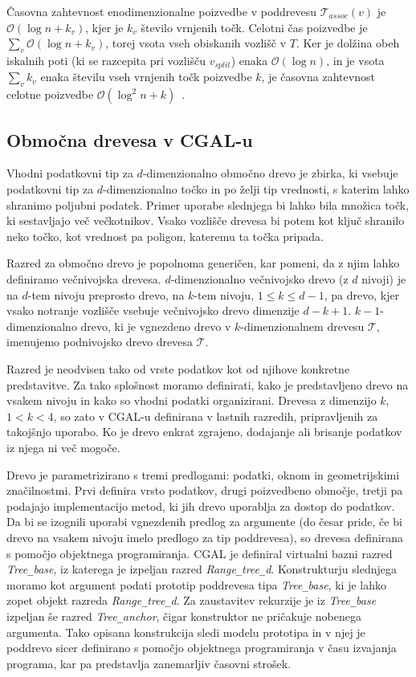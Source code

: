 \documentclass[a4paper, 12pt]{book}
\newcommand{\T}{\ensuremath{\mathcal{T}}}
\newcommand{\OO}{\ensuremath{\mathcal{O}}} %
\newcommand{\U}{\texttt{\_}}
\begin{document}
Časovna zahtevnost enodimenzionalne poizvedbe v poddrevesu $\T_{assoc}(v)$ je $\OO(\log n + k_v)$, kjer je $k_v$ število vrnjenih točk. Celotni čas poizvedbe je $\sum_v\OO(\log n + k_v)$, torej vsota vseh obiskanih vozlišč v $T$. Ker je dolžina obeh iskalnih poti (ki se razcepita pri vozlišču $v_{split}$) enaka $\OO(\log n)$, in je vsota $\sum_v k_v$ enaka številu vseh vrnjenih točk poizvedbe $k$, je časovna zahtevnost celotne poizvedbe $\OO(\log^2n + k)$~\cite[poglavje 5.3]{bkos-08-all}.

\subsection{Območna drevesa v CGAL-u}
Vhodni podatkovni tip za $d$-dimenzionalno območno drevo je zbirka, ki vsebuje podatkovni tip za $d$-dimenzionalno točko in po želji tip vrednosti, s katerim lahko shranimo poljubni podatek. Primer uporabe slednjega bi lahko bila množica točk, ki sestavljajo več večkotnikov. Vsako vozlišče drevesa bi potem kot ključ shranilo neko točko, kot vrednost pa poligon, kateremu ta točka pripada. 

Razred za območno drevo je popolnoma generičen, kar pomeni, da z njim lahko definiramo večnivojska drevesa. $d$-dimenzionalno večnivojsko drevo  (z $d$ nivoji) je na $d$-tem nivoju preprosto drevo, na $k$-tem nivoju, $1 \leq k \leq d-1$, pa drevo, kjer vsako notranje vozlišče vsebuje večnivojsko drevo dimenzije $d-k+1$. $k-1$-dimenzionalno drevo, ki je vgnezdeno drevo v $k$-dimenzionalnem drevesu \T, imenujemo podnivojsko drevo drevesa \T. 


Razred je neodvisen tako od vrste podatkov kot od njihove konkretne predstavitve. Za tako splošnost moramo definirati, kako je predstavljeno drevo na vsakem nivoju in kako so vhodni podatki organizirani. Drevesa z dimenzijo $k$, $ 1 < k < 4$, so zato v CGAL-u definirana v lastnih razredih, pripravljenih za takojšnjo uporabo. Ko je drevo enkrat zgrajeno, dodajanje ali brisanje podatkov iz njega ni več mogoče.

\bigbreak
Drevo je parametrizirano s tremi predlogami: podatki, oknom in geometrijskimi značilnostmi. Prvi definira vrsto podatkov, drugi poizvedbeno območje, tretji pa podajajo implementacijo metod, ki jih drevo uporablja za dostop do podatkov. Da bi se izognili uporabi vgnezdenih predlog za argumente (do česar pride, če bi drevo na vsakem nivoju imelo predlogo za tip poddrevesa), so drevesa definirana s pomočjo objektnega programiranja. CGAL je definiral virtualni bazni razred \textit{Tree\U base}, iz katerega je izpeljan razred \textit{Range\U tree\U d}. Konstrukturju slednjega moramo kot argument podati prototip poddrevesa tipa \textit{Tree\U base}, ki je lahko zopet objekt razreda \textit{Range\U tree\U d}. Za zaustavitev rekurzije je iz \textit{Tree\U base} izpeljan še razred \textit{Tree\U anchor}, čigar konstruktor ne pričakuje nobenega argumenta. Tako opisana konstrukcija sledi modelu prototipa in v njej je poddrevo sicer definirano s pomočjo objektnega programiranja v času izvajanja programa, kar pa predstavlja zanemarljiv časovni strošek.
\end{document}
